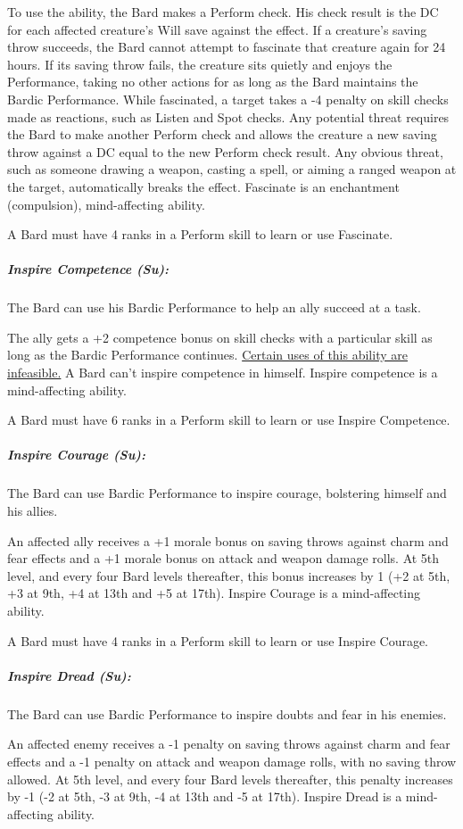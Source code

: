 To use the ability, the Bard makes a Perform check. His check result is the DC for each affected creature's Will save against the effect. If a creature's saving throw succeeds, the Bard cannot attempt to fascinate that creature again for 24 hours. If its saving throw fails, the creature sits quietly and enjoys the Performance, taking no other actions for as long as the Bard maintains the Bardic Performance. While fascinated, a target takes a -4 penalty on skill checks made as reactions, such as Listen and Spot checks. Any potential threat requires the Bard to make another Perform check and allows the creature a new saving throw against a DC equal to the new Perform check result. Any obvious threat, such as someone drawing a weapon, casting a spell, or aiming a ranged weapon at the target, automatically breaks the effect. 
Fascinate is an enchantment (compulsion), mind-affecting ability.

A Bard must have 4 ranks in a Perform skill to learn or use Fascinate.
\subparagraph{Inspire Competence (Su):}
The Bard can use his Bardic Performance to help an ally succeed at a task. 

The ally gets a +2 competence bonus on skill checks with a particular skill as long as the Bardic Performance continues. \href{http://www.giantitp.com/comics/oots0004.html}{Certain uses of this ability are infeasible.} A Bard can't inspire competence in himself. Inspire competence is a mind-affecting ability.

A Bard must have 6 ranks in a Perform skill to learn or use Inspire Competence.
\subparagraph{Inspire Courage (Su):}
The Bard can use Bardic Performance to inspire courage, bolstering himself and his allies.

An affected ally receives a +1 morale bonus on saving throws against charm and fear effects and a +1 morale bonus on attack and weapon damage rolls. At 5th level, and every four Bard levels thereafter, this bonus increases by 1 (+2 at 5th, +3 at 9th, +4 at 13th and +5 at 17th). Inspire Courage is a mind-affecting ability.

A Bard must have 4 ranks in a Perform skill to learn or use Inspire Courage.
\subparagraph{Inspire Dread (Su):}
The Bard can use Bardic Performance to inspire doubts and fear in his enemies.

An affected enemy receives a -1 penalty on saving throws against charm and fear effects and a -1 penalty on attack and weapon damage rolls, with no saving throw allowed. At 5th level, and every four Bard levels thereafter, this penalty increases by -1 (-2 at 5th, -3 at 9th, -4 at 13th and -5 at 17th). Inspire Dread is a mind-affecting ability.

